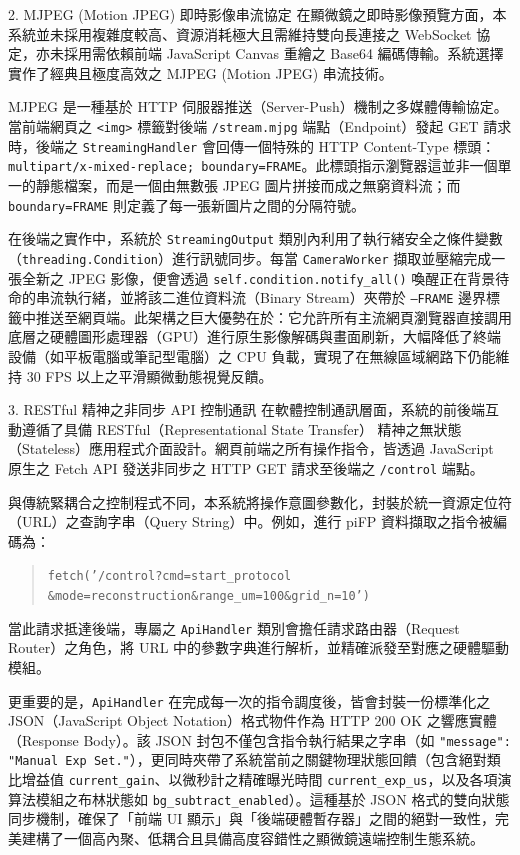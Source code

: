 2. MJPEG (Motion JPEG) 即時影像串流協定
在顯微鏡之即時影像預覽方面，本系統並未採用複雜度較高、資源消耗極大且需維持雙向長連接之 WebSocket 協定，亦未採用需依賴前端 JavaScript Canvas 重繪之 Base64 編碼傳輸。系統選擇實作了經典且極度高效之 MJPEG (Motion JPEG) 串流技術。

MJPEG 是一種基於 HTTP 伺服器推送（Server-Push）機制之多媒體傳輸協定。當前端網頁之 \texttt{<img>} 標籤對後端 \texttt{/stream.mjpg} 端點（Endpoint）發起 GET 請求時，後端之 \texttt{StreamingHandler} 會回傳一個特殊的 HTTP Content-Type 標頭：\texttt{multipart/x-mixed-replace; boundary=FRAME}。此標頭指示瀏覽器這並非一個單一的靜態檔案，而是一個由無數張 JPEG 圖片拼接而成之無窮資料流；而 \texttt{boundary=FRAME} 則定義了每一張新圖片之間的分隔符號。

在後端之實作中，系統於 \texttt{StreamingOutput} 類別內利用了執行緒安全之條件變數（\texttt{threading.Condition}）進行訊號同步。每當 \texttt{CameraWorker} 擷取並壓縮完成一張全新之 JPEG 影像，便會透過 \texttt{self.condition.notify\_all()} 喚醒正在背景待命的串流執行緒，並將該二進位資料流（Binary Stream）夾帶於 \texttt{--FRAME} 邊界標籤中推送至網頁端。此架構之巨大優勢在於：它允許所有主流網頁瀏覽器直接調用底層之硬體圖形處理器（GPU）進行原生影像解碼與畫面刷新，大幅降低了終端設備（如平板電腦或筆記型電腦）之 CPU 負載，實現了在無線區域網路下仍能維持 30 FPS 以上之平滑顯微動態視覺反饋。

3. RESTful 精神之非同步 API 控制通訊
在軟體控制通訊層面，系統的前後端互動遵循了具備 RESTful（Representational State Transfer） 精神之無狀態（Stateless）應用程式介面設計。網頁前端之所有操作指令，皆透過 JavaScript 原生之 Fetch API 發送非同步之 HTTP GET 請求至後端之 \texttt{/control} 端點。

與傳統緊耦合之控制程式不同，本系統將操作意圖參數化，封裝於統一資源定位符（URL）之查詢字串（Query String）中。例如，進行 piFP 資料擷取之指令被編碼為：
\begin{quote}
\texttt{fetch('/control?cmd=start\_protocol} \\
\texttt{\&mode=reconstruction\&range\_um=100\&grid\_n=10')}
\end{quote}當此請求抵達後端，專屬之 \texttt{ApiHandler} 類別會擔任請求路由器（Request Router）之角色，將 URL 中的參數字典進行解析，並精確派發至對應之硬體驅動模組。

更重要的是，\texttt{ApiHandler} 在完成每一次的指令調度後，皆會封裝一份標準化之 JSON（JavaScript Object Notation）格式物件作為 HTTP 200 OK 之響應實體（Response Body）。該 JSON 封包不僅包含指令執行結果之字串（如 \texttt{"message": "Manual Exp Set."}），更同時夾帶了系統當前之關鍵物理狀態回饋（包含絕對類比增益值 \texttt{current\_gain}、以微秒計之精確曝光時間 \texttt{current\_exp\_us}，以及各項演算法模組之布林狀態如 \texttt{bg\_subtract\_enabled}）。這種基於 JSON 格式的雙向狀態同步機制，確保了「前端 UI 顯示」與「後端硬體暫存器」之間的絕對一致性，完美建構了一個高內聚、低耦合且具備高度容錯性之顯微鏡遠端控制生態系統。


